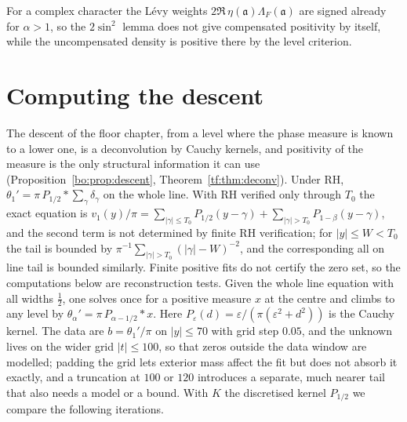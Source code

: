 For a complex character the L\'evy weights $2\Re\,\eta(\mathfrak a)\Lambda_F(\mathfrak a)$ are signed already for $\alpha>1$, so the $2\sin^2$ lemma does not give compensated positivity by itself, while the uncompensated density is positive there by the level criterion.

\section{Computing the descent}\label{qt:sec:compute}

The descent of the floor chapter, from a level where the phase measure is known to a lower one, is a deconvolution by Cauchy kernels, and positivity of the measure is the only structural information it can use (Proposition~\ref{bo:prop:descent}, Theorem~\ref{tf:thm:deconv}). Under RH, $\theta_1'=\pi\,P_{1/2}*\sum_\gamma\delta_\gamma$ on the whole line. With RH verified only through $T_0$ the exact equation is $v_1(y)/\pi=\sum_{|\gamma|\le T_0}P_{1/2}(y-\gamma)+\sum_{|\gamma|>T_0}P_{1-\beta}(y-\gamma)$, and the second term is not determined by finite RH verification; for $|y|\le W<T_0$ the tail is bounded by $\pi^{-1}\sum_{|\gamma|>T_0}(|\gamma|-W)^{-2}$, and the corresponding all on line tail is bounded similarly. Finite positive fits do not certify the zero set, so the computations below are reconstruction tests. Given the whole line equation with all widths $\frac12$, one solves once for a positive measure $x$ at the centre and climbs to any level by $\theta_\alpha'=\pi\,P_{\alpha-1/2}*x$. Here $P_\varepsilon(d)=\varepsilon/(\pi(\varepsilon^2+d^2))$ is the Cauchy kernel. The data are $b=\theta_1'/\pi$ on $|y|\le70$ with grid step $0.05$, and the unknown lives on the wider grid $|t|\le100$, so that zeros outside the data window are modelled; padding the grid lets exterior mass affect the fit but does not absorb it exactly, and a truncation at $100$ or $120$ introduces a separate, much nearer tail that also needs a model or a bound. With $K$ the discretised kernel $P_{1/2}$ we compare the following iterations.

